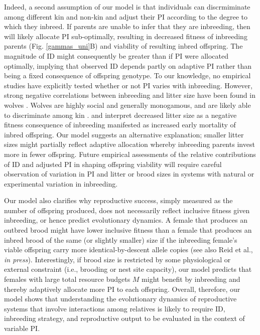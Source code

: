 \documentclass[12pt]{article}
\begin{document}
Indeed, a second assumption of our model is that individuals can discrmiminate among different kin and non-kin and adjust their PI according to the degree to which they inbreed. If parents are unable to infer that they are inbreeding, then will likely allocate PI sub-optimally, resulting in decreased fitness of inbreeding parents (Fig. \ref{gammas_uni}B) and viability of resulting inbred offspring. The magnitude of ID might consequently be greater than if PI were allocated optimally, implying that observed ID depends partly on adaptive PI rather than being a fixed consequence of offspring genotype. To our knowledge, no empirical studies have explicitly tested whether or not PI varies with inbreeding. However, strong negative correlations between inbreeding and litter size have been found in wolves \cite[\textit{Canis lupus};][]{Liberg2005, Fredrickson2007}. Wolves are highly social and generally monogamous, and are likely able to discriminate among kin \cite[][]{Raikkonen2009, Geffen2011}. \cite{Liberg2005} and \cite{Fredrickson2007} interpret decreased litter size as a negative fitness consequence of inbreeding manifested as increased early mortality of inbred offspring. Our model suggests an alternative explanation; smaller litter sizes might partially reflect adaptive allocation whereby inbreeding parents invest more in fewer offspring. Future empirical assessments of the relative contributions of ID and adjusted PI in shaping offspring viability will require careful observation of variation in PI and litter or brood sizes in systems with natural or experimental variation in inbreeding.

Our model also clarifies why reproductive success, simply measured as the number of offspring produced, does not necessarily reflect inclusive fitness given inbreeding, or hence predict evolutionary dynamics. A female that produces an outbred brood might have lower inclusive fitness than a female that produces an inbred brood of the same (or slightly smaller) size if the inbreeding female's viable offspring carry more identical-by-descent allele copies (see also Reid et al., \textit{in press}). Interestingly, if brood size is restricted by some physiological or external constraint (i.e., brooding or nest site capacity), our model predicts that females with large total resource budgets $M$ might benefit by inbreeding and thereby adaptively allocate more PI to each offspring. Overall, therefore, our model shows that understanding the evolutionary dynamics of reproductive systems that involve interactions among relatives is likely to require ID, inbreeding strategy, and reproductive output to be evaluated in the context of variable PI.
\end{document}
